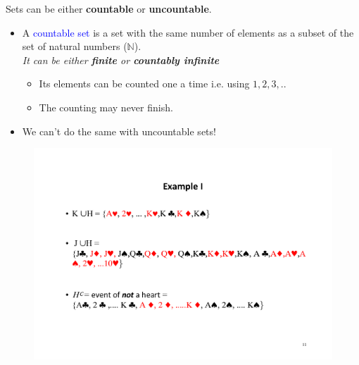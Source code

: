 \documentclass[notes=show]{beamer}\usepackage[]{graphicx}\usepackage[]{color}
\begin{document}
\begin{frame}{\secname}

Sets can be either \textbf{countable} or \textbf{uncountable}.

\vspace{0.5cm}

\begin{itemize}
\item A \textcolor{blue}{countable set} is a set with the same number of elements as a subset of the set of natural numbers ($\mathbb{N}$).\\[0.5em]

\textit{It can be either \textbf{finite} or \textbf{countably infinite}}
  \begin{itemize}
  \item Its elements can be counted one a time i.e. using $1,2,3,..$
  \item The counting may never finish.
  \end{itemize}
\item We can't do the same with uncountable sets!
\end{itemize}
\end{frame}


\begin{frame}{\secname}
  \begin{example} 
  \begin{figure}[h!]
  \centering
  \includegraphics[scale=0.4]{img/Example2.pdf}
  \end{figure}
  \end{example}
\end{frame}
\end{document}
